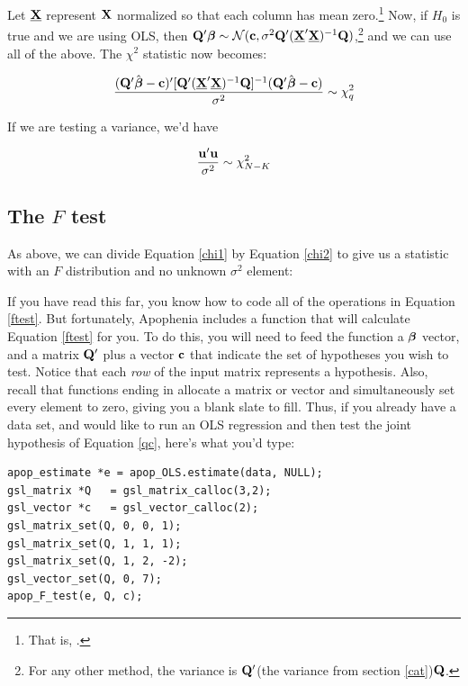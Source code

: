 Let $\underbar{\bf X}$ represent ${\bf X}$ normalized so that each column has mean
zero.\footnote{That is, .}
Now, if $H_0$ is true and we are using OLS, then ${\bf Q}' {\mbox{\boldmath$\beta$}} \sim {\cal
N}({\bf c}, \sigma^2 {\bf Q}' (\underbar{\bf X}'\underbar{\bf X})^{-1} {\bf Q})$,\footnote{For any other
method, the variance is ${\bf Q}'$(the variance from section
\ref{cat})${\bf Q}$.} 
and we can use all of the above. The $\chi^2$
statistic now becomes:

\begin{equation}		\label{chi1}
{({\bf Q}'\hat{{\mbox{\boldmath$\beta$}}}- {\bf c})' [{\bf Q}' (\underbar{\bf X}'\underbar{\bf X})^{-1} {\bf Q}]^{-1} ({\bf Q}' \hat{{\mbox{\boldmath$\beta$}}}- {\bf c})
\over \sigma^2} \sim \chi^2_q
\end{equation}

If we are testing a variance, we'd have 

\begin{equation}		\label{chi2}
{{\bf u}' {\bf u} \over \sigma^2} \sim \chi^2_{N-K}
\end{equation}


\subsection{The $F$ test}\label{ftestsec}

As above, we can divide Equation \ref{chi1} by Equation \ref{chi2}
to give us a statistic with an $F$ distribution and no unknown
$\sigma^2$ element:


\startonecol
{}
\endonecol

If you have read this far, you know how to code all of the operations
in Equation \ref{ftest}.  But fortunately, 
Apophenia includes a function that will calculate Equation \ref{ftest}
for you.
To do this, you will need to feed the function a ${\mbox{\boldmath$\beta$}}$ vector, and a
matrix ${\bf Q}'$ plus a vector ${\bf c}$ that indicate the set of hypotheses
you wish to test. Notice that each {\em row} of the input matrix represents a
hypothesis. Also, recall that functions ending in  allocate
a matrix or vector and simultaneously set every element to zero, giving
you a blank slate to fill. Thus, if you already have a data set, and
would like to run an OLS regression and then test the joint hypothesis
of Equation \ref{qc}, here's what you'd type:
\begin{lstlisting}
apop_estimate *e = apop_OLS.estimate(data, NULL);
gsl_matrix *Q   = gsl_matrix_calloc(3,2);
gsl_vector *c   = gsl_vector_calloc(2);
gsl_matrix_set(Q, 0, 0, 1);
gsl_matrix_set(Q, 1, 1, 1);
gsl_matrix_set(Q, 1, 2, -2);
gsl_vector_set(Q, 0, 7);
apop_F_test(e, Q, c);
\end{lstlisting}

